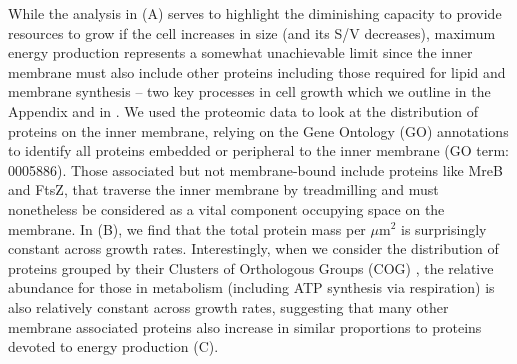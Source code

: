 While the analysis in (A) serves to highlight the
diminishing capacity to provide resources to grow if the cell increases in
size (and its S/V decreases), maximum energy production represents a somewhat
unachievable limit since the inner membrane must also include other proteins
including those required for lipid and membrane synthesis -- two key processes
in cell growth which we outline in the Appendix and in . We used the
proteomic data to look at the distribution of proteins on the inner membrane,
relying on the Gene Ontology (GO) annotations
\citep{ashburner2000,thegeneOntologyconsortium2018} to identify all proteins
embedded or peripheral to the inner membrane (GO term: 0005886). Those
associated but not membrane-bound include proteins like MreB and FtsZ, that
traverse the inner membrane by treadmilling and must nonetheless be
considered as a vital component occupying space on the membrane. In
 (B), we find that the total protein mass per $\mu$m$^2$
is surprisingly constant across growth rates. Interestingly, when we consider
the distribution of proteins grouped by their Clusters of Orthologous Groups
(COG) \citep{tatusov2000}, the relative abundance for those in metabolism
(including ATP synthesis via respiration) is also relatively constant across
growth rates, suggesting that many other membrane associated proteins also
increase in similar proportions to proteins devoted to energy production
 (C).


